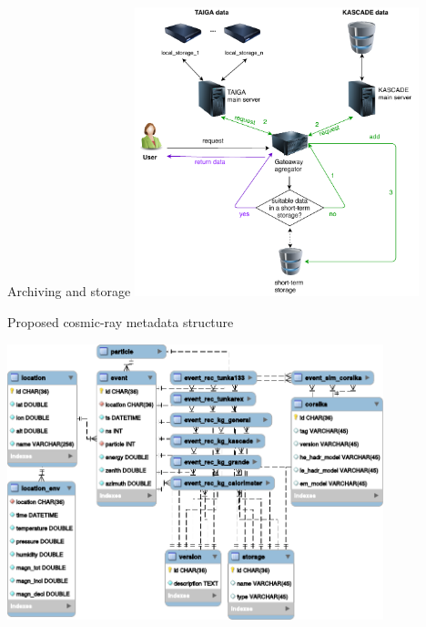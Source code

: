 \begin{frame}{Archiving and storage}
\centering
\includegraphics[width=0.62\textwidth]{pics/data_workflow_4.pdf}
\end{frame}

\begin{frame}{Proposed cosmic-ray metadata structure}
\vspace{-1.5em}
\begin{center}
\includegraphics[width=0.82\textwidth]{pics/metadata.pdf}
\end{center}
\end{frame}

